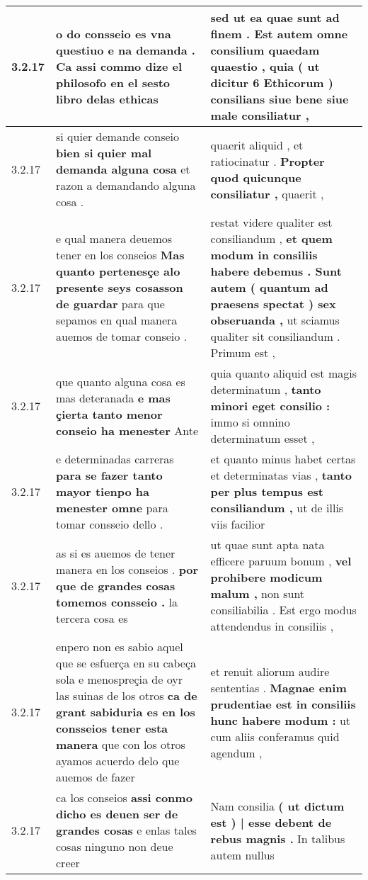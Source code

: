 \begin{tabular}{|p{1cm}|p{6.5cm}|p{6.5cm}|}
3.2.17 & o do consseio es vna questiuo \textbf{ e na demanda . } Ca assi commo dize el philosofo en el sesto libro delas ethicas & sed ut ea quae sunt ad finem . \textbf{ Est autem omne consilium quaedam quaestio , } quia ( ut dicitur 6 Ethicorum ) consilians siue bene siue male consiliatur , \\\hline
3.2.17 & si quier demande conseio \textbf{ bien si quier mal demanda alguna cosa } et razon a demandando alguna cosa . & quaerit aliquid , et ratiocinatur . \textbf{ Propter quod quicunque consiliatur , } quaerit , \\\hline
3.2.17 & e qual manera deuemos tener en los conseios \textbf{ Mas quanto pertenesçe alo presente seys cosasson de guardar } para que sepamos en qual manera auemos de tomar conseio . & restat videre qualiter est consiliandum , \textbf{ et quem modum in consiliis habere debemus . Sunt autem ( quantum ad praesens spectat ) sex obseruanda , } ut sciamus qualiter sit consiliandum . Primum est , \\\hline
3.2.17 & que quanto alguna cosa es mas deteranada \textbf{ e mas çierta tanto menor conseio ha menester } Ante & quia quanto aliquid est magis determinatum , \textbf{ tanto minori eget consilio : } immo si omnino determinatum esset , \\\hline
3.2.17 & e determinadas carreras \textbf{ para se fazer tanto mayor tienpo ha menester omne } para tomar consseio dello . & et quanto minus habet certas et determinatas vias , \textbf{ tanto per plus tempus est consiliandum , } ut de illis viis facilior \\\hline
3.2.17 & as si es auemos de tener manera en los conseios . \textbf{ por que de grandes cosas tomemos consseio . } la tercera cosa es & ut quae sunt apta nata efficere paruum bonum , \textbf{ vel prohibere modicum malum , } non sunt consiliabilia . Est ergo modus attendendus in consiliis , \\\hline
3.2.17 & enpero non es sabio aquel que se esfuerça en su cabeça sola e menospreçia de oyr las suinas de los otros \textbf{ ca de grant sabiduria es en los consseios tener esta manera } que con los otros ayamos acuerdo delo que auemos de fazer & et renuit aliorum audire sententias . \textbf{ Magnae enim prudentiae est in consiliis hunc habere modum : } ut cum aliis conferamus quid agendum , \\\hline
3.2.17 & ca los conseios \textbf{ assi conmo dicho es deuen ser de grandes cosas } e enlas tales cosas ninguno non deue creer & Nam consilia \textbf{ ( ut dictum est ) | esse debent de rebus magnis . } In talibus autem nullus \\\hline

\end{tabular}
